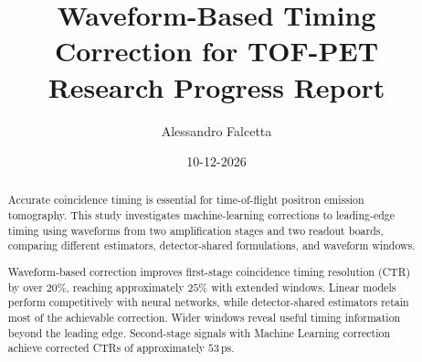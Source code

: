 \documentclass[10pt,a4paper,twocolumn]{article}
\title{
    Waveform-Based Timing Correction for TOF-PET\\
    \large Research Progress Report
}
\author{Alessandro Falcetta}
\date{10-12-2026}
\begin{document}
\maketitle

\begin{abstract}
Accurate coincidence timing is essential for time-of-flight positron emission tomography. 
This study investigates machine-learning corrections to leading-edge timing using waveforms 
from two amplification stages and two readout boards, comparing different estimators, 
detector-shared formulations, and waveform windows.

Waveform-based correction improves first-stage coincidence timing resolution (CTR) by over $20\%$, 
reaching approximately $25\%$ with extended windows. Linear models perform competitively with neural networks, 
while detector-shared estimators retain most of the achievable correction. 
Wider windows reveal useful timing information beyond the leading edge. 
Second-stage signals with Machine Learning correction achieve corrected CTRs 
of approximately $53\,\mathrm{ps}$.
\end{abstract}






\FloatBarrier


\clearpage
\appendix


\FloatBarrier
\end{document}
